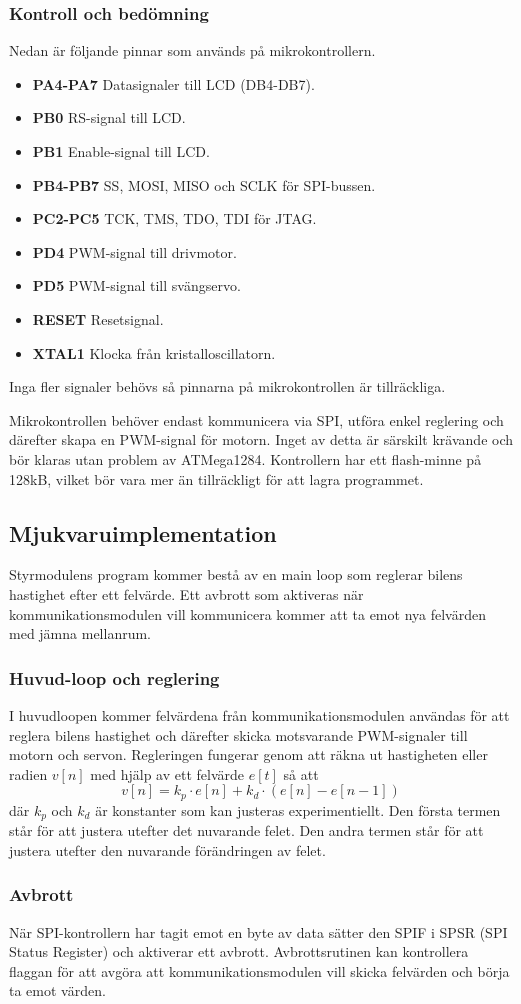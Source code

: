 \documentclass[designspec/spec.tex]{subfiles}
\begin{document}
\subsubsection{Kontroll och bedömning}
Nedan är följande pinnar som används på mikrokontrollern.
\begin{itemize}
   \item \textbf{PA4-PA7} Datasignaler till LCD (DB4-DB7).
   \item \textbf{PB0} RS-signal till LCD.
   \item \textbf{PB1} Enable-signal till LCD.
   \item \textbf{PB4-PB7} SS, MOSI, MISO och SCLK för SPI-bussen.
   \item \textbf{PC2-PC5} TCK, TMS, TDO, TDI för JTAG.
   \item \textbf{PD4} PWM-signal till drivmotor.
   \item \textbf{PD5} PWM-signal till svängservo.
   \item \textbf{RESET} Resetsignal.
   \item \textbf{XTAL1} Klocka från kristalloscillatorn.
\end{itemize}
Inga fler signaler behövs så pinnarna på mikrokontrollen är tillräckliga.

Mikrokontrollen behöver endast kommunicera via SPI, utföra enkel reglering och
därefter skapa en PWM-signal för motorn. Inget av detta är särskilt krävande
och bör klaras utan problem av ATMega1284. Kontrollern har ett flash-minne på
128kB, vilket bör vara mer än tillräckligt för att lagra programmet.

\subsection{Mjukvaruimplementation}
Styrmodulens program kommer bestå av en main loop som reglerar bilens hastighet
efter ett felvärde. Ett avbrott som aktiveras när kommunikationsmodulen vill
kommunicera kommer att ta emot nya felvärden med jämna mellanrum.

\subsubsection{Huvud-loop och reglering}
I huvudloopen kommer felvärdena från kommunikationsmodulen användas för att
reglera bilens hastighet och därefter skicka motsvarande PWM-signaler till
motorn och servon. Regleringen fungerar genom att räkna ut hastigheten eller
radien $v[n]$ med hjälp av ett felvärde $e[t]$ så att
\begin{equation*}
    v[n] = k_p \cdot e[n] + k_d \cdot (e[n]-e[n-1])
\end{equation*}
där $k_p$ och $k_d$ är konstanter som kan justeras experimentiellt. Den första
termen står för att justera utefter det nuvarande felet. Den andra termen står
för att justera utefter den nuvarande förändringen av felet.

\subsubsection{Avbrott} \label{sec:ctrl-int}
När SPI-kontrollern har tagit emot en byte av data sätter den SPIF i SPSR (SPI
Status Register) och aktiverar ett avbrott. Avbrottsrutinen kan kontrollera
flaggan för att avgöra att kommunikationsmodulen vill skicka felvärden och
börja ta emot värden.
\end{document}
